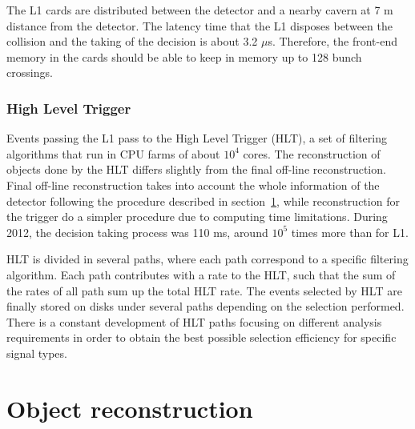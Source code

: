 The L1 cards are distributed between the detector and a nearby cavern at 7 m distance from the detector. The latency time that the L1 disposes between the collision and the taking of the decision is about 3.2 $\mu$s. Therefore, the front-end memory in the cards should be able to keep in memory up to 128 bunch crossings. 

\subsubsection{High Level Trigger}
\label{sec:HLT}


Events passing the L1 pass to the High Level Trigger (HLT), a set of filtering algorithms that run in CPU farms of about $10^{4}$ cores. The reconstruction of objects done by the HLT differs slightly from the final off-line reconstruction. Final off-line reconstruction takes into account the whole information of the detector following the procedure described in section~\ref{sec:reco}, while reconstruction for the trigger do a simpler procedure due to computing time limitations. During 2012, the decision taking process was 110 ms, around $10^{5}$ times more than for L1.

HLT is divided in several paths, where each path correspond to a specific filtering algorithm. Each path contributes with a rate to the HLT, such that the sum of the rates of all path sum up the total HLT rate. The events selected by HLT are finally stored on disks under several paths depending on the selection performed. There is a constant development of HLT paths focusing on different analysis requirements in order to obtain the best possible selection efficiency for specific signal types. 

\section{Object reconstruction}
\label{sec:reco}


